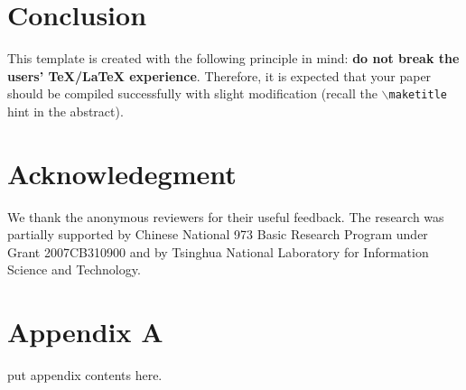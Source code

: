 \documentclass{ics}
\begin{document}
\section{Conclusion}
\label{sec:conclusion}
This template is created with the following principle in mind: \textbf{do not
  break the users' \TeX/\LaTeX{} experience}. Therefore, it is expected that
your paper should be compiled successfully with slight modification (recall the
\texttt{$\backslash$maketitle} hint in the abstract).

\section*{Acknowledegment}
\label{sec:acknowledegment}
We thank the anonymous reviewers for their useful feedback. The research was
partially supported by Chinese National 973 Basic Research Program under Grant
2007CB310900 and by Tsinghua National Laboratory for Information Science and
Technology. 


\appendix
\section*{Appendix A}
put appendix contents here.


% 
% 
\end{document}
